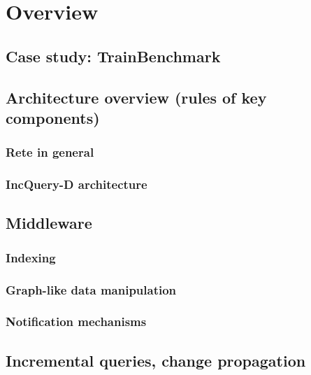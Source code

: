 \chapter{Overview}

\section{Case study: TrainBenchmark}


\section{Architecture overview (rules of key components)}

\subsection{Rete in general}


\subsection{IncQuery-D architecture}


\section{Middleware}

\subsection{Indexing}

\subsection{Graph-like data manipulation}

\subsection{Notification mechanisms}

\section{Incremental queries, change propagation}

